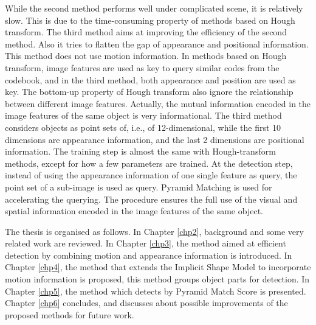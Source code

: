 While the second method performs well under complicated scene, it is relatively slow. This is due to the time-consuming property of methods based on Hough transform.   The third method aims at improving the efficiency of the second method. Also it tries to flatten the gap of appearance and positional information. This method does not use motion information. In methods based on Hough transform, image features are used as key to query similar codes from the codebook, and in the third method, both appearance and position are used as key. The bottom-up property of Hough transform also ignore the relationship between different image features. Actually, the mutual information encoded in the image features of the same object is very informational. The third method considers objects as point sets of, i.e., of 12-dimensional, while the first 10 dimensions are appearance information, and the last 2 dimensions are positional information. The training step is almost the same with Hough-transform methods, except for how a few parameters are trained. At the detection step, instead of using the appearance information of one single feature as query, the point set of a sub-image is used as query. Pyramid Matching is used for accelerating the querying. The procedure ensures the full use of the visual and spatial  information encoded in the image features of the same object.

The thesis is organised as follows. In Chapter \ref{chp2}, background and some very related work are reviewed. In Chapter \ref{chp3}, the method aimed at efficient detection by combining motion and appearance information is introduced. In Chapter \ref{chp4}, the method that extends the Implicit Shape Model to incorporate motion information is proposed, this method groups object parts for detection. In Chapter \ref{chp5}, the method which detects by Pyramid Match Score is presented. Chapter \ref{chp6} concludes, and discusses about possible improvements of the proposed methods for future work.



